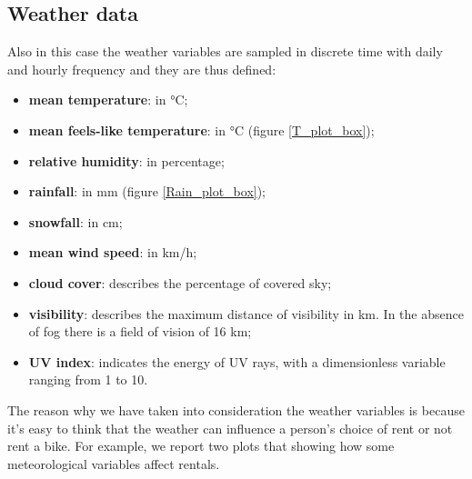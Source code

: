 \subsection{Weather data}
Also in this case the weather variables are sampled in discrete time with daily and hourly frequency and they are thus defined:
\begin{itemize}
	\item \textbf{mean temperature}: in \unit{\degreeCelsius};
	\item \textbf{mean feels-like temperature}: in \unit{\degreeCelsius} (figure \ref{T_plot_box});
	\item \textbf{relative humidity}: in percentage;
	\item \textbf{rainfall}: in \unit{\milli\meter} (figure \ref{Rain_plot_box});
	\item \textbf{snowfall}: in \unit{\centi\meter};
	\item \textbf{mean wind speed}: in \unit{\kilo\meter/\hour};
	\item \textbf{cloud cover}: describes the percentage of covered sky;
	\item \textbf{visibility}: describes the maximum distance of visibility in \unit{\kilo\meter}. In the absence of fog there is a field of vision of \num{16} km;
	\item \textbf{UV index}: indicates the energy of UV rays, with a dimensionless variable ranging from \num{1} to \num{10}.
\end{itemize}
The reason why we have taken into consideration the weather variables is because it's easy to think that the weather can influence a person's choice of rent or not rent a bike. For example, we report two plots that showing how some meteorological variables affect rentals.

